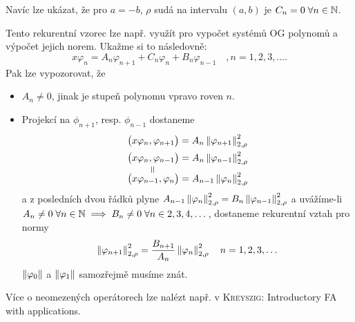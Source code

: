 \begin{remark}
    Navíc lze ukázat, že pro $a=-b$, $\rho$ sudá na intervalu $(a,b)$ je $C_n=0 \;\forall n\in\mathbb{N}$.
\end{remark}
Tento rekurentní vzorec lze např. využít pro vypočet systémů OG polynomů a výpočet jejich norem. Ukažme si to následovně:
$$x\varphi_n=A_n\varphi_{n+1} + C_n\varphi_n + B_n\varphi_{n-1}\quad,n=1,2,3,\dots.$$
Pak lze vypozorovat, že
\begin{itemize}
    \item $A_n\neq0$, jinak je stupeň polynomu vpravo roven $n$.
    \item Projekcí na $\phi_{n+1}$, resp. $\phi_{n-1}$ dostaneme 
        \begin{align*}
            &\innerprod{x\varphi_n}{\varphi_{n+1}}=A_n\norm{\varphi_{n+1}}_{2,\rho}^2\\
            &\underset{\rotatebox[origin=c]{90}{=}}{\innerprod{x\varphi_n}{\varphi_{n-1}}}=A_n\norm{\varphi_{n-1}}_{2,\rho}^2\\[-6pt]
            &\innerprod{x\varphi_{n-1}}{\varphi_n}=A_{n-1}\norm{\varphi_n}_{2,\rho}^2
        \end{align*}
        a z posledních dvou řádků plyne $A_{n-1}\left\lVert\varphi_n\right\rVert_{2,\rho}^2=B_n\left\lVert\varphi_{n-1}\right\rVert_{2,\rho}^2$ a uvážíme-li $A_n\neq0\;\forall n\in\mathbb{N}\implies B_n\neq0\;\forall n\in 2,3,4,\dots$, dostaneme rekurentní vztah pro normy
        $$\left\lVert\varphi_{n+1}\right\rVert_{2,\rho}^2=\frac{B_{n+1}}{A_n}\left\lVert\varphi_n\right\rVert_{2,\rho}^2\quad n=1,2,3,\dots$$
        $\left\lVert\varphi_0\right\rVert$ a $\left\lVert\varphi_1\right\rVert$ samozřejmě musíme znát.
\end{itemize}
Více o neomezených operátorech lze nalézt např. v \textsc{Kreyszig}: Introductory FA with applications. %

